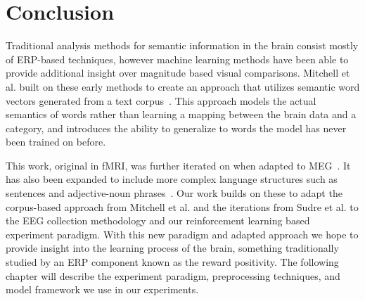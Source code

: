 \section{Conclusion}

Traditional analysis methods for semantic information in the brain consist 
mostly of ERP-based techniques, however machine learning methods have been able 
to provide additional insight over magnitude based visual comparisons. Mitchell 
et al. built on these early methods to create an approach that utilizes 
semantic word vectors generated from a text corpus~\cite{Mitchell2008}. This 
approach models the actual semantics of words rather than learning a mapping 
between the brain data and a category, and introduces the ability to generalize 
to words the model has never been trained on before. 

This work, original in fMRI, was further iterated on when adapted to 
MEG~\cite{Sudre2012}. It has also been expanded to include more complex 
language structures such as sentences and adjective-noun 
phrases~\cite{pereira2018toward, afyshethesis}. Our work builds on these to 
adapt the corpus-based approach from Mitchell et al. and the iterations from 
Sudre et al. to the EEG collection methodology and our reinforcement learning 
based experiment paradigm. With this new paradigm and adapted approach we hope 
to provide insight into the learning process of the brain, something 
traditionally studied by an ERP component known as the reward positivity. The 
following chapter will describe the experiment paradigm, preprocessing 
techniques, and model framework we use in our experiments.
